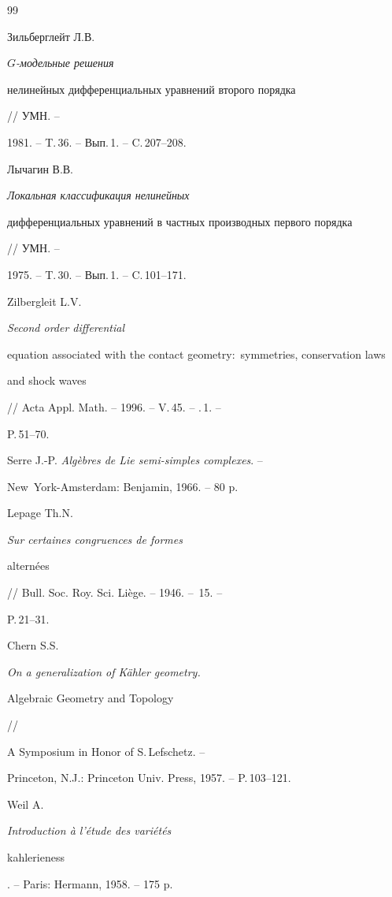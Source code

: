 \begin{thebibliography}{99}







Зильберглейт Л.В. {\it $G$-модельные решения


нелинейных дифференциальных уравнений второго порядка} // УМН. --


1981. -- T.\,36. -- Вып.\,1. -- C.\,207--208.




Лычагин В.В. {\it Локальная классификация нелинейных 


дифференциальных уравнений в частных производных первого порядка} // УМН. --


1975. -- T.\,30. -- Вып.\,1. -- C.\,101--171.




Zilbergleit L.V. {\it Second order differential


equation associated with the contact geometry$:$ symmetries, conservation laws


and shock waves} // Acta Appl. Math. -- 1996. -- V.\,45. -- \No.\,1. --


P.\,51--70.




Serre J.-P. {\it Alg\`ebres de Lie semi-simples complexes}. --


New~York-Amsterdam: Benjamin, 1966. -- 80 p.




Lepage Th.N. {\it Sur certaines congruences de formes


altern\'ees} // Bull. Soc. Roy. Sci. Li\`ege. -- 1946. -- \No\,15. --


P.\,21--31.




Chern S.S. {\it On a generalization of K\"ahler geometry. 


Algebraic Geometry and Topology} //\linebreak


A Symposium in Honor of S.\,Lefschetz. --


Princeton, N.J.: Princeton Univ. Press, 1957. -- P.\,103--121.




Weil A. {\it Introduction \`a l'\'etude des vari\'et\'es


kahlerieness}. -- Paris: Hermann, 1958. -- 175 p.



\end{thebibliography}
